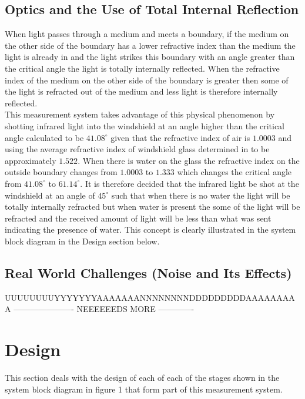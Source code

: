 \documentclass[conference, 11pt]{IEEEtran}
\begin{document}
	
\subsection{Optics and the Use of Total Internal Reflection}
When light passes through a medium and meets a boundary, if the medium on the other side of the boundary has a lower refractive index than the medium the light is already in and the light strikes this boundary with an angle greater than the critical angle the light is totally internally reflected. When the refractive index of the medium on the other side of the boundary is greater then some of the light is refracted out of the medium and less light is therefore internally reflected. \\

This measurement system takes advantage of this physical phenomenon by shotting infrared light into the windshield at an angle higher than the critical angle calculated to be $41.08 ^{\circ}$ given that the refractive index of air is $1.0003$ and using the average refractive index of windshield glass determined in \cite{RI} to be approximately $1.522$. When there is water on the glass the refractive index on the outside boundary changes from $1.0003$ to $1.333$ which changes the critical angle from $41.08 ^{\circ}$ to $61.14 ^{\circ}$. It is therefore decided that the infrared light be shot at the windshield at an angle of $45 ^{\circ}$ such that when there is no water the light will be totally internally refracted but when water is present the some of the light will be refracted and the received amount of light will be less than what was sent indicating the presence of water. This concept is clearly illustrated in the system block diagram in the Design section below. 

	
\subsection{Real World Challenges (Noise and Its Effects)}
UUUUUUUUYYYYYYYAAAAAAANNNNNNNNDDDDDDDDDAAAAAAAAA
---------------------- NEEEEEEDS MORE -------------
\cite{NOISE}
	
\section{Design}
This section deals with the design of each of each of the stages shown in the system block diagram in figure 1 that form part of this measurement system. 
\end{document}

